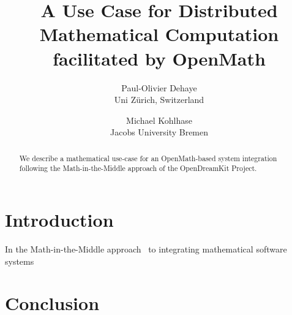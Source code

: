 \documentclass[a4paper]{article}
\author{Paul-Olivier Dehaye\\
  Uni Z\"urich, Switzerland
  \and
  Michael Kohlhase\\
  Jacobs University Bremen}
\title{A Use Case for Distributed Mathematical Computation facilitated by OpenMath}
\begin{document}
\maketitle
\begin{abstract}
  We describe a mathematical use-case for an OpenMath-based system integration following
  the Math-in-the-Middle approach of the OpenDreamKit Project. 
\end{abstract}
\section{Introduction}\label{sec:intro}
In the Math-in-the-Middle approach~\cite{DehKohKon:iop16} to integrating mathematical
software systems
\section{Conclusion}\label{sec:concl}
\printbibliography
\end{document}

